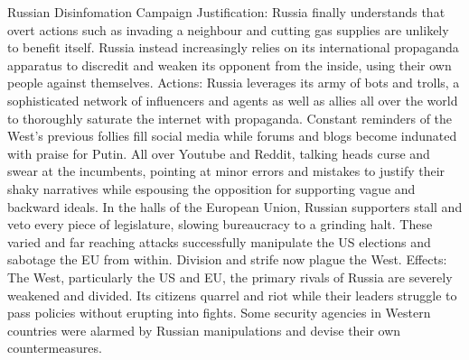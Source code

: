    Russian Disinfomation Campaign
        Justification:
            Russia finally understands that overt actions such as invading a neighbour and cutting gas supplies are unlikely to benefit itself.
            Russia instead increasingly relies on its international propaganda apparatus to discredit and weaken its opponent from the inside, using their own people against themselves.
        Actions:
            Russia leverages its army of bots and trolls, a sophisticated network of influencers and agents as well as allies all over the world to thoroughly saturate the internet with propaganda. Constant reminders of the West's previous follies fill social media while forums and blogs become indunated with praise for Putin. All over Youtube and Reddit, talking heads curse and swear at the incumbents, pointing at minor errors and mistakes to justify their shaky narratives while espousing the opposition for supporting vague and backward ideals. In the halls of the European Union, Russian supporters stall and veto every piece of legislature, slowing bureaucracy to a grinding halt. These varied and far reaching attacks successfully manipulate the US elections and sabotage the EU from within.
            Division and strife now plague the West.
        Effects:
            The West, particularly the US and EU, the primary rivals of Russia are severely weakened and divided. Its citizens quarrel and riot while their leaders struggle to pass policies without erupting into fights.
            Some security agencies in Western countries were alarmed by Russian manipulations and devise their own countermeasures.

